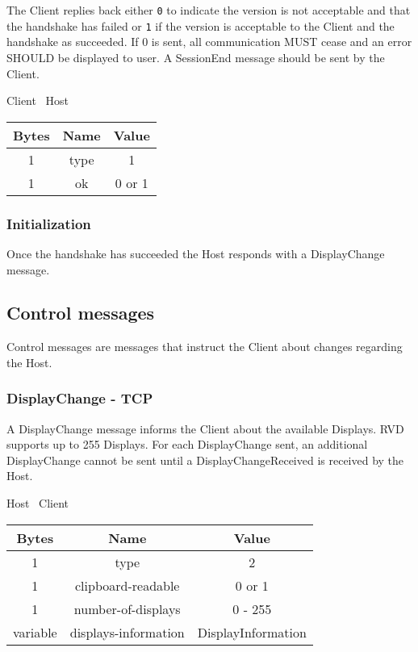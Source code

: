 The Client replies back either \texttt{0} to indicate the version is not acceptable and that the handshake has
failed or \texttt{1} if the version is acceptable to the Client and the handshake as succeeded. If 0 is sent, all
communication MUST cease and an error SHOULD be displayed to user. A SessionEnd message should be sent by
the Client.

\begin{center}
    Client \textrightarrow\ Host\\
    \begin{tabular}{|c|c|c|}
        \hline
        \textbf{Bytes} & \textbf{Name} & \textbf{Value} \\
        \hline
        1              & type          & 1              \\
        \hline
        1              & ok            & 0 or 1         \\
        \hline
    \end{tabular}
\end{center}

\subsubsection{Initialization}

Once the handshake has succeeded the Host responds with a DisplayChange message.

\subsection{Control messages}
Control messages are messages that instruct the Client about changes regarding the Host.

\subsubsection{DisplayChange - TCP}
A DisplayChange message informs the Client about the available Displays. RVD supports up to 255
Displays. For each DisplayChange sent, an additional DisplayChange cannot be sent until a DisplayChangeReceived is
received by the Host.

\begin{center}
    Host \textrightarrow\ Client\\
    \begin{tabular}{|c|c|c|}
        \hline
        \textbf{Bytes} & \textbf{Name}        & \textbf{Value}     \\
        \hline
        1              & type                 & 2                  \\
        \hline
        1              & clipboard-readable   & 0 or 1             \\
        \hline
        1              & number-of-displays   & 0 - 255            \\
        \hline
        variable       & displays-information & DisplayInformation \\
        \hline
    \end{tabular}
\end{center}

